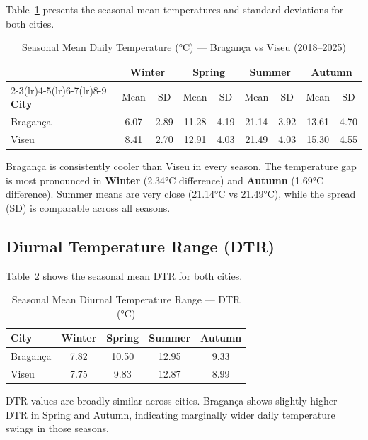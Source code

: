 \documentclass[11pt,a4paper]{article}
\begin{document}
Table~\ref{tab:temp_summary} presents the seasonal mean temperatures and standard deviations for both cities.

\begin{table}[H]
\centering
\caption{Seasonal Mean Daily Temperature (°C) — Bragança vs Viseu (2018–2025)}
\label{tab:temp_summary}
\begin{tabular}{lcccccccc}
\toprule
 & \multicolumn{2}{c}{\textbf{Winter}} & \multicolumn{2}{c}{\textbf{Spring}} & \multicolumn{2}{c}{\textbf{Summer}} & \multicolumn{2}{c}{\textbf{Autumn}} \\
\cmidrule(lr){2-3}\cmidrule(lr){4-5}\cmidrule(lr){6-7}\cmidrule(lr){8-9}
\textbf{City} & Mean & SD & Mean & SD & Mean & SD & Mean & SD \\
\midrule
Bragança & 6.07 & 2.89 & 11.28 & 4.19 & 21.14 & 3.92 & 13.61 & 4.70 \\
Viseu    & 8.41 & 2.70 & 12.91 & 4.03 & 21.49 & 4.03 & 15.30 & 4.55 \\
\bottomrule
\end{tabular}
\end{table}

Bragança is consistently cooler than Viseu in every season. The temperature gap is most pronounced in \textbf{Winter} (2.34°C difference) and \textbf{Autumn} (1.69°C difference). Summer means are very close (21.14°C vs 21.49°C), while the spread (SD) is comparable across all seasons.

\subsection{Diurnal Temperature Range (DTR)}

Table~\ref{tab:dtr_summary} shows the seasonal mean DTR for both cities.

\begin{table}[H]
\centering
\caption{Seasonal Mean Diurnal Temperature Range — DTR (°C)}
\label{tab:dtr_summary}
\begin{tabular}{lcccc}
\toprule
\textbf{City} & \textbf{Winter} & \textbf{Spring} & \textbf{Summer} & \textbf{Autumn} \\
\midrule
Bragança & 7.82 & 10.50 & 12.95 & 9.33 \\
Viseu    & 7.75 & 9.83  & 12.87 & 8.99 \\
\bottomrule
\end{tabular}
\end{table}

DTR values are broadly similar across cities. Bragança shows slightly higher DTR in Spring and Autumn, indicating marginally wider daily temperature swings in those seasons.
\end{document}
